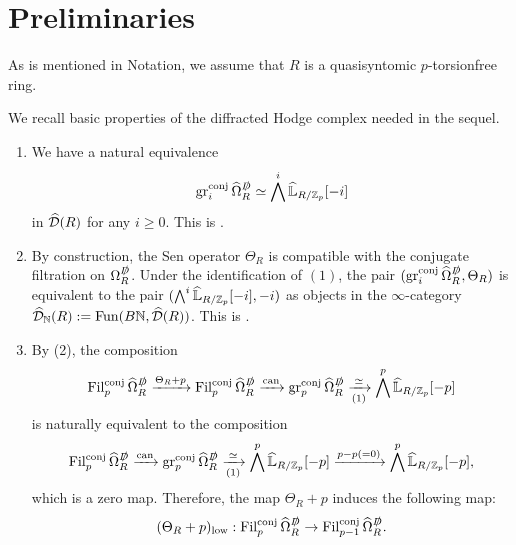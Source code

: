 \documentclass[11pt,a4paper]{amsart}
\begin{document}
\section{Preliminaries}
As is mentioned in Notation, we assume that $R$ is a quasisyntomic $p$-torsionfree ring.
\begin{proposition}\label{remark3.2}
    We recall basic properties of the diffracted Hodge complex needed in the sequel.
    \begin{enumerate}
        \item We have a natural equivalence\[\operatorname{gr}_i^{\operatorname{conj}}\widehat\Omega_R^{\slashed D}\simeq \bigwedge^i\widehat{\mathbb{L}}_{R/\mathbb{Z}_p}[-i] \] in $\widehat{\mathcal{D}}(R)$ for any $i\ge 0$. This is \cite[Construction 4.7.1]{bhatt2022Absolute}.
        \item By construction, the Sen operator $\Theta_R$ is compatible with the conjugate filtration on $\Omega_R^{\slashed D}$. Under the identification of $(1)$, the pair $(\operatorname{gr}_i^{\operatorname{conj}}\widehat\Omega_R^{\slashed D},\Theta_R)$ is equivalent to the pair $(\bigwedge^i\widehat{\mathbb{L}}_{R/\mathbb{Z}_p}[-i],-i)$ as objects in the $\infty$-category $\widehat{\mathcal{D}}_{\mathbb{N}}(R):=\operatorname{Fun}(B\mathbb{N},\widehat{\mathcal{D}}(R))$. This is \cite[Notation 4.7.2]{bhatt2022Absolute}.
        \item By (2), the composition
        \[
        \operatorname{Fil}_p^{\operatorname{conj}}\widehat\Omega_R^{\slashed D}\xrightarrow[]{\Theta_R+p}\operatorname{Fil}_p^{\operatorname{conj}}\widehat\Omega_R^{\slashed D}\xrightarrow[]{\operatorname{can}}\operatorname{gr}_p^{\operatorname{conj}}\widehat\Omega_R^{\slashed D}\xrightarrow[(1)]{\simeq } \bigwedge^p\widehat{\mathbb{L}}_{R/\mathbb{Z}_p}[-p]
        \]
        is naturally equivalent to the composition\[\operatorname{Fil}_p^{\operatorname{conj}}\widehat\Omega_R^{\slashed D}\xrightarrow[]{\operatorname{can}}\operatorname{gr}_p^{\operatorname{conj}}\widehat\Omega_R^{\slashed D}\xrightarrow[(1)]{\simeq } \bigwedge^p\widehat{\mathbb{L}}_{R/\mathbb{Z}_p}[-p]\xrightarrow[]{p-p(=0)} \bigwedge^p\widehat{\mathbb{L}}_{R/\mathbb{Z}_p}[-p],\] which is a zero map. Therefore, the map $\Theta_R+p$ induces the following map:
        \[(\Theta_R+p)_{\mathrm{low}}:\operatorname{Fil}_p^{\operatorname{conj}}\widehat\Omega_R^{\slashed D}\to \operatorname{Fil}_{p-1}^{\operatorname{conj}}\widehat\Omega_R^{\slashed D}.\] 

\end{enumerate}
\end{proposition}
\end{document}
